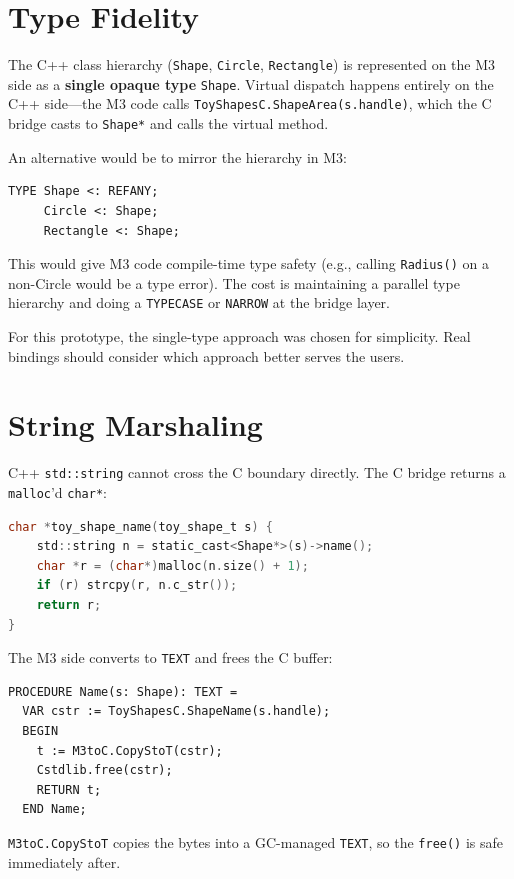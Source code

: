 \documentclass[11pt]{article}
\begin{document}
\section{Type Fidelity}

The C++ class hierarchy (\texttt{Shape}, \texttt{Circle},
\texttt{Rectangle}) is represented on the M3 side as a
\textbf{single opaque type} \texttt{Shape}.  Virtual dispatch
happens entirely on the C++ side---the M3 code calls
\texttt{ToyShapesC.ShapeArea(s.handle)}, which the C bridge
casts to \texttt{Shape*} and calls the virtual method.

An alternative would be to mirror the hierarchy in M3:
\begin{lstlisting}
TYPE Shape <: REFANY;
     Circle <: Shape;
     Rectangle <: Shape;
\end{lstlisting}
This would give M3 code compile-time type safety (e.g., calling
\texttt{Radius()} on a non-Circle would be a type error).  The
cost is maintaining a parallel type hierarchy and doing a
\texttt{TYPECASE} or \texttt{NARROW} at the bridge layer.

For this prototype, the single-type approach was chosen for
simplicity.  Real bindings should consider which approach better
serves the users.

\section{String Marshaling}

C++ \texttt{std::string} cannot cross the C boundary directly.
The C bridge returns a \texttt{malloc}'d \texttt{char*}:

\begin{lstlisting}[language=C]
char *toy_shape_name(toy_shape_t s) {
    std::string n = static_cast<Shape*>(s)->name();
    char *r = (char*)malloc(n.size() + 1);
    if (r) strcpy(r, n.c_str());
    return r;
}
\end{lstlisting}

The M3 side converts to \texttt{TEXT} and frees the C buffer:

\begin{lstlisting}
PROCEDURE Name(s: Shape): TEXT =
  VAR cstr := ToyShapesC.ShapeName(s.handle);
  BEGIN
    t := M3toC.CopyStoT(cstr);
    Cstdlib.free(cstr);
    RETURN t;
  END Name;
\end{lstlisting}

\texttt{M3toC.CopyStoT} copies the bytes into a GC-managed
\texttt{TEXT}, so the \texttt{free()} is safe immediately after.
\end{document}

